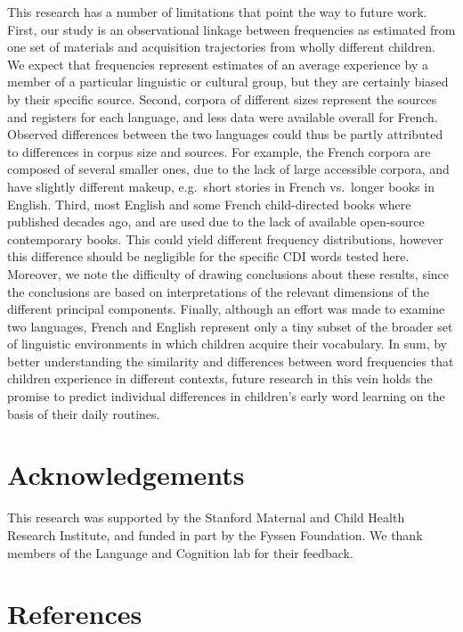 \documentclass[10pt, letterpaper]{article}
\begin{document}
This research has a number of limitations that point the way to future
work. First, our study is an observational linkage between frequencies
as estimated from one set of materials and acquisition trajectories from
wholly different children. We expect that frequencies represent
estimates of an average experience by a member of a particular
linguistic or cultural group, but they are certainly biased by their
specific source. Second, corpora of different sizes represent the
sources and registers for each language, and less data were available
overall for French. Observed differences between the two languages could
thus be partly attributed to differences in corpus size and sources. For
example, the French corpora are composed of several smaller ones, due to
the lack of large accessible corpora, and have slightly different
makeup, e.g.~short stories in French vs.~longer books in English. Third,
most English and some French child-directed books where published
decades ago, and are used due to the lack of available open-source
contemporary books. This could yield different frequency distributions,
however this difference should be negligible for the specific CDI words
tested here. Moreover, we note the difficulty of drawing conclusions
about these results, since the conclusions are based on interpretations
of the relevant dimensions of the different principal components.
Finally, although an effort was made to examine two languages, French
and English represent only a tiny subset of the broader set of
linguistic environments in which children acquire their vocabulary. In
sum, by better understanding the similarity and differences between word
frequencies that children experience in different contexts, future
research in this vein holds the promise to predict individual
differences in children's early word learning on the basis of their
daily routines.

\hypertarget{acknowledgements}{%
\section{Acknowledgements}\label{acknowledgements}}

This research was supported by the Stanford Maternal and Child Health
Research Institute, and funded in part by the Fyssen Foundation. We
thank members of the Language and Cognition lab for their feedback.

\hypertarget{references}{%
\section{References}\label{references}}
\end{document}
